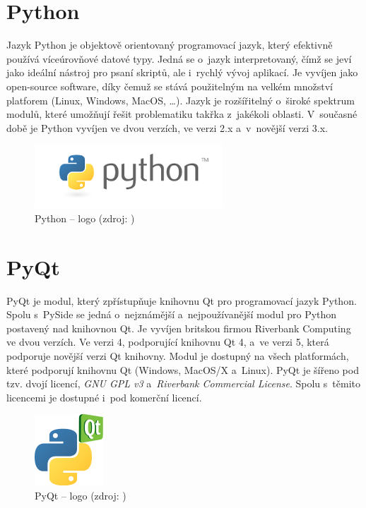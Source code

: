 \documentclass[a4paper,12pt,oneside]{book}
\begin{document}
\section{Python}

Jazyk Python je objektově orientovaný programovací jazyk, který
efektivně používá víceúrovňové datové typy. Jedná se o~jazyk
interpretovaný, čímž se jeví jako ideální nástroj pro psaní skriptů,
ale i~rychlý vývoj aplikací. Je vyvíjen jako open-source software,
díky čemuž se stává použitelným na velkém množství platforem (Linux,
Windows, MacOS, \dots). Jazyk je rozšířitelný o~široké spektrum
modulů, které umožňují řešit problematiku takřka z~jakékoli
oblasti. V~současné době je Python vyvíjen ve dvou verzích, ve verzi
2.x a~v~novější verzi 3.x.  \cite{dive_into_python} \cite{python_web}

\begin{figure}[htb]
\centering
\includegraphics[scale=.7]{images/python-logo.png}
\caption[Python -- logo]{Python -- logo (zdroj: \cite{python_web})}
\end{figure}

\newpage
\section{PyQt}

PyQt je modul, který zpřístupňuje knihovnu Qt pro programovací jazyk
Python. Spolu s~PySide se jedná o~nejznámější a~nejpoužívanější modul
pro Python postavený nad knihovnou Qt. Je vyvíjen britskou firmou
Riverbank Computing ve dvou verzích. Ve verzi 4, podporující knihovnu
Qt 4, a~ve verzi 5, která podporuje novější verzi Qt knihovny. Modul
je dostupný na všech platformách, které podporují knihovnu Qt
(Windows, MacOS/X a~Linux). PyQt je šířeno pod tzv. dvojí licencí,
\textit{GNU GPL v3} a~\textit{Riverbank Commercial License}. Spolu
s~těmito licencemi je dostupné i~pod komerční licencí.

\begin{figure}[htb]
\centering
\includegraphics[scale=1]{images/pyqt-logo.png}
\caption[PyQt -- logo]{PyQt -- logo (zdroj: \cite{pyqt_wiki})}
\end{figure}
\end{document}
